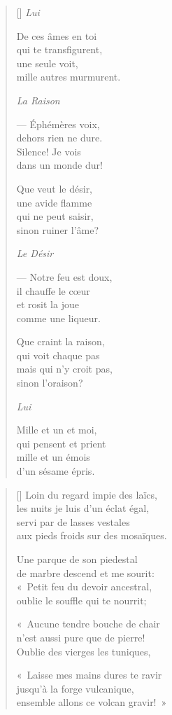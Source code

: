 \documentclass[11pt,a4paper]{book}
\begin{document}
\begin{verse}[\versewidth]
\emph{Lui}

De ces âmes en toi \\
qui te transfigurent, \\
une seule voit, \\
mille autres murmurent.

\emph{La Raison}

--- Éphémères voix, \\
dehors rien ne dure. \\
Silence! Je vois \\
dans un monde dur!

Que veut le désir, \\
une avide flamme \\
qui ne peut saisir, \\
sinon ruiner l'âme?

\emph{Le Désir}

--- Notre feu est doux, \\
il chauffe le cœur \\
et rosit la joue \\
comme une liqueur.

Que craint la raison, \\
qui voit chaque pas \\
mais qui n'y croit pas, \\
sinon l'oraison?

\emph{Lui}

Mille et un et moi, \\
qui pensent et prient \\
mille et un émois \\
d'un sésame épris.
\end{verse}

\newpage


\settowidth{\versewidth}{aux pieds froids sur des mosaïques.}

\bigskip

\begin{verse}[\versewidth]
  Loin du regard impie des laïcs, \\
  les nuits je luis d'un éclat égal, \\
  servi par de lasses vestales \\
  aux pieds froids sur des mosaïques.

  Une parque de son piedestal \\
  de marbre descend et me sourit: \\
  «~Petit feu du devoir ancestral, \\
  oublie le souffle qui te nourrit;

  «~Aucune tendre bouche de chair \\
  n'est aussi pure que de pierre! \\
  Oublie des vierges les tuniques,

  «~Laisse mes mains dures te ravir \\
  jusqu'à la forge vulcanique, \\
  ensemble allons ce volcan gravir!~»
\end{verse}
\end{document}
